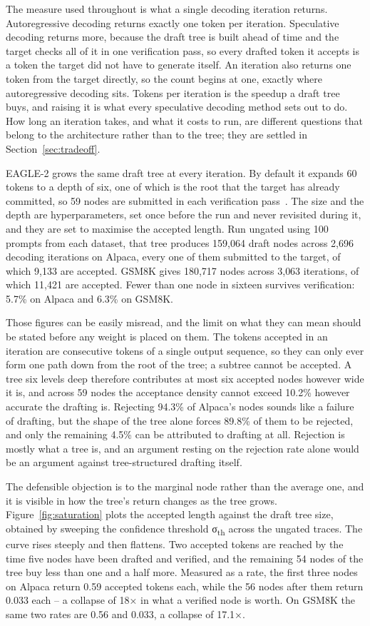\documentclass[11pt]{article}
\begin{document}
The measure used throughout is what a single decoding iteration returns. Autoregressive decoding returns exactly one token per iteration. Speculative decoding returns more, because the draft tree is built ahead of time and the target checks all of it in one verification pass, so every drafted token it accepts is a token the target did not have to generate itself. An iteration also returns one token from the target directly, so the count begins at one, exactly where autoregressive decoding sits. Tokens per iteration is the speedup a draft tree buys, and raising it is what every speculative decoding method sets out to do. How long an iteration takes, and what it costs to run, are different questions that belong to the architecture rather than to the tree; they are settled in Section~\ref{sec:tradeoff}.

EAGLE-2 grows the same draft tree at every iteration. By default it expands 60 tokens to a depth of six, one of which is the root that the target has already committed, so 59 nodes are submitted in each verification pass~\cite{li2024eagle2}. The size and the depth are hyperparameters, set once before the run and never revisited during it, and they are set to maximise the accepted length. Run ungated using 100 prompts from each dataset, that tree produces 159{,}064 draft nodes across 2{,}696 decoding iterations on Alpaca, every one of them submitted to the target, of which 9{,}133 are accepted. GSM8K gives 180{,}717 nodes across 3{,}063 iterations, of which 11{,}421 are accepted. Fewer than one node in sixteen survives verification: 5.7\% on Alpaca and 6.3\% on GSM8K.

Those figures can be easily misread, and the limit on what they can mean should be stated before any weight is placed on them. The tokens accepted in an iteration are consecutive tokens of a single output sequence, so they can only ever form one path down from the root of the tree; a subtree cannot be accepted. A tree six levels deep therefore contributes at most six accepted nodes however wide it is, and across 59 nodes the acceptance density cannot exceed 10.2\% however accurate the drafting is. Rejecting 94.3\% of Alpaca's nodes sounds like a failure of drafting, but the shape of the tree alone forces 89.8\% of them to be rejected, and only the remaining 4.5\% can be attributed to drafting at all. Rejection is mostly what a tree is, and an argument resting on the rejection rate alone would be an argument against tree-structured drafting itself.

The defensible objection is to the marginal node rather than the average one, and it is visible in how the tree's return changes as the tree grows. Figure~\ref{fig:saturation} plots the accepted length against the draft tree size, obtained by sweeping the confidence threshold σ\textsubscript{th} across the ungated traces. The curve rises steeply and then flattens. Two accepted tokens are reached by the time five nodes have been drafted and verified, and the remaining 54 nodes of the tree buy less than one and a half more. Measured as a rate, the first three nodes on Alpaca return 0.59 accepted tokens each, while the 56 nodes after them return 0.033 each -- a collapse of 18× in what a verified node is worth. On GSM8K the same two rates are 0.56 and 0.033, a collapse of 17.1×.
\end{document}
